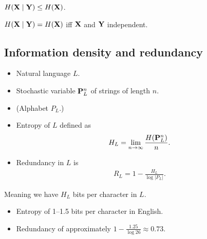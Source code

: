 \begin{frame}
  \begin{corollary}
    \(H(\mathbf X\mid \mathbf Y) \leq H(\mathbf X)\).
  \end{corollary}

  \begin{corollary}
    \(H(\mathbf X\mid \mathbf Y) = H(\mathbf X)\) iff \(\mathbf X\) and \(\mathbf 
      Y\) independent.
  \end{corollary}
\end{frame}
%
%

\subsection{Information density and redundancy}

\begin{frame}
  \begin{definition}
    \begin{itemize}
      \item Natural language \(L\).
      \item Stochastic variable \(\mathbf P^n_L\) of strings of length \(n\).
      \item (Alphabet \(P_L\).)
      \item Entropy of \(L\) defined as
        \begin{align*}
          H_L = \lim_{n\to \infty}\frac{H(\mathbf P^n_L)}{n}.
        \end{align*}
      \item Redundancy in \(L\) is
        \begin{align*}
          R_L = 1 - \frac{H_L}{\log |P_L|}.
        \end{align*}
    \end{itemize}
  \end{definition}
\end{frame}

\begin{frame}
  \begin{remark}
    Meaning we have \(H_L\) bits per character in \(L\).
  \end{remark}

  \begin{example}
    \begin{itemize}
      \item Entropy of 1--1.5 bits per character in English.
      \item Redundancy of approximately \(1 - \frac{1.25}{\log 26} \approx 
          0.73\).
    \end{itemize}
  \end{example}

\end{frame}

